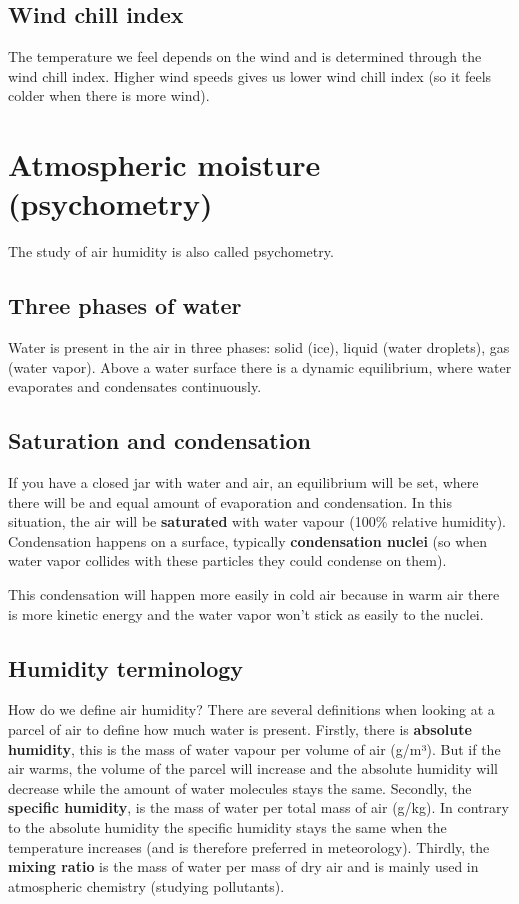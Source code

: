 \documentclass[oneside]{book}
\begin{document}
\subsection{Wind chill index}\label{wind-chill-index}

The temperature we feel depends on the wind and is determined through
the wind chill index. Higher wind speeds gives us lower wind chill index
(so it feels colder when there is more wind).

\section{Atmospheric moisture
(psychometry)}\label{atmospheric-moisture-psychometry}

The study of air humidity is also called psychometry.

\subsection{Three phases of water}\label{three-phases-of-water}

Water is present in the air in three phases: solid (ice), liquid (water
droplets), gas (water vapor). Above a water surface there is a dynamic
equilibrium, where water evaporates and condensates continuously.

\subsection{Saturation and
condensation}\label{saturation-and-condensation}

If you have a closed jar with water and air, an equilibrium will be set,
where there will be and equal amount of evaporation and condensation. In
this situation, the air will be \textbf{saturated} with water vapour
(100\% relative humidity). Condensation happens on a surface, typically
\textbf{condensation nuclei} (so when water vapor collides with these
particles they could condense on them).

This condensation will happen more easily in cold air because in warm
air there is more kinetic energy and the water vapor won't stick as
easily to the nuclei.

\subsection{Humidity terminology}\label{humidity-terminology}

How do we define air humidity? There are several definitions when
looking at a parcel of air to define how much water is present. Firstly,
there is \textbf{absolute humidity}, this is the mass of water vapour
per volume of air (g/m³). But if the air warms, the volume of the parcel
will increase and the absolute humidity will decrease while the amount
of water molecules stays the same. Secondly, the \textbf{specific
humidity}, is the mass of water per total mass of air (g/kg). In
contrary to the absolute humidity the specific humidity stays the same
when the temperature increases (and is therefore preferred in
meteorology). Thirdly, the \textbf{mixing ratio} is the mass of water
per mass of dry air and is mainly used in atmospheric chemistry
(studying pollutants).
\end{document}

